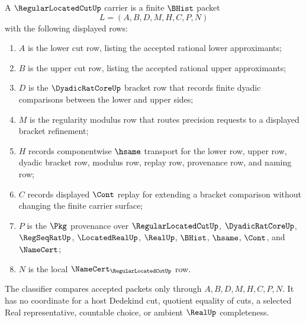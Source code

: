 \begin{definition}
\label{def:regular-located-cut-carrier}
A $\RegularLocatedCutUp$ carrier is a finite $\BHist$ packet
$$
L=(A,B,D,M,H,C,P,N)
$$
with the following displayed rows:
\begin{enumerate}
\item $A$ is the lower cut row, listing the accepted rational lower approximants;
\item $B$ is the upper cut row, listing the accepted rational upper approximants;
\item $D$ is the $\DyadicRatCoreUp$ bracket row that records finite dyadic comparisons between the lower and upper sides;
\item $M$ is the regularity modulus row that routes precision requests to a displayed bracket refinement;
\item $H$ records componentwise $\hsame$ transport for the lower row, upper row, dyadic bracket row, modulus row, replay row, provenance row, and naming row;
\item $C$ records displayed $\Cont$ replay for extending a bracket comparison without changing the finite carrier surface;
\item $P$ is the $\Pkg$ provenance over $\RegularLocatedCutUp$, $\DyadicRatCoreUp$, $\RegSeqRatUp$, $\LocatedRealUp$, $\RealUp$, $\BHist$, $\hsame$, $\Cont$, and $\NameCert$;
\item $N$ is the local $\NameCert_{\RegularLocatedCutUp}$ row.
\end{enumerate}
The classifier compares accepted packets only through $A,B,D,M,H,C,P,N$. It has no coordinate for a host Dedekind cut, quotient equality of cuts, a selected Real representative, countable choice, or ambient $\RealUp$ completeness.
\end{definition}

